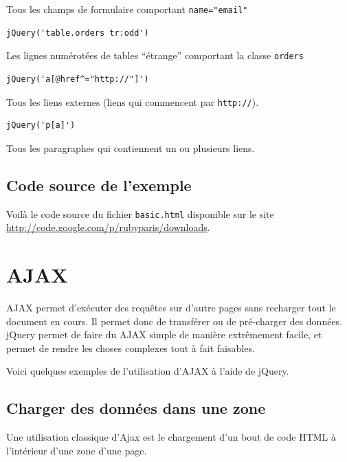 \documentclass[10pt,a4paper,titlepage]{article}
\begin{document}
Tous les champs de formulaire comportant \texttt{name="email"}

\begin{lstlisting}
jQuery('table.orders tr:odd')
\end{lstlisting}

Les lignes numérotées de tables “étrange” comportant la classe \texttt{orders}

\begin{lstlisting}
jQuery('a[@href^="http://"]')
\end{lstlisting}

Tous les liens externes (liens qui commencent par \verb!http://!).

\begin{lstlisting}
jQuery('p[a]')
\end{lstlisting}

Tous les paragraphes qui contiennent un ou plusieurs liens.

\subsection{Code source de l'exemple}

Voilà le code source du fichier \texttt{basic.html} disponible sur le site \url{http://code.google.com/p/rubyparis/downloads}.



\newpage
\section{AJAX}

AJAX permet d'exécuter des requêtes sur d'autre pages sans recharger tout le document en cours. Il permet donc de transférer ou de pré-charger des données. jQuery permet de faire du AJAX simple de manière extrêmement facile, et permet de rendre les choses complexes tout à fait faisables. 

Voici quelques exemples de l'utilisation d'AJAX à l'aide de jQuery.

\subsection{Charger des données dans une zone}

Une utilisation classique d'Ajax est le chargement d'un bout de code HTML à l'intérieur d'une zone d'une page.
\end{document}
